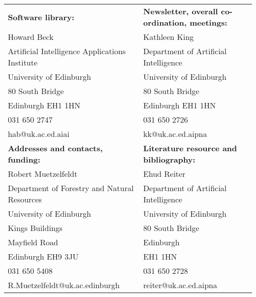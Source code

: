 \begin{tabular}{l|l}
{\bf Software library:} & {\bf Newsletter, overall co-ordination,
meetings:}\\ 
Howard Beck &  Kathleen King\\
Artificial Intelligence Applications Institute &  Department of
Artificial Intelligence \\
University of Edinburgh & University of Edinburgh\\
80 South Bridge & 80 South Bridge\\
Edinburgh EH1 1HN & Edinburgh EH1 1HN\\
031 650 2747 & 031 650 2726\\
hab@uk.ac.ed.aiai & kk@uk.ac.ed.aipna\\
\hline
{\bf Addresses and contacts, funding:} & {\bf Literature resource and bibliography:} \\ 
Robert Muetzelfeldt & Ehud Reiter\\
Department of Forestry and Natural Resources &   Department of Artificial Intelligence\\
University of Edinburgh & University of Edinburgh\\
Kings Buildings & 80 South Bridge\\
 Mayfield Road &  Edinburgh\\
Edinburgh   EH9 3JU & EH1 1HN\\
 031 650 5408 & 031 650 2728\\
 R.Muetzelfeldt@uk.ac.edinburgh & reiter@uk.ac.ed.aipna\\
\hline

\end{tabular}




